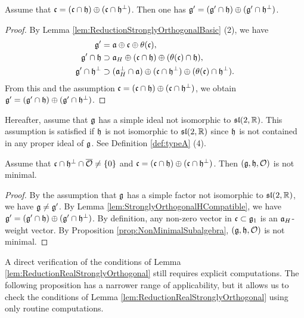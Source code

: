 \begin{lemma} \label{lem:StronglyOrthogonalHCompatible}
	Assume that $\mathfrak{c} = (\mathfrak{c} \cap \mathfrak{h}) \oplus (\mathfrak{c} \cap \mathfrak{h}^\perp)$.
	Then one has $\mathfrak{g'} = (\mathfrak{g'} \cap \mathfrak{h}) \oplus (\mathfrak{g'} \cap \mathfrak{h}^\perp)$.
\end{lemma}

\begin{proof}
	By Lemma \ref{lem:ReductionStronglyOrthogonalBasic} (2), we have
	\begin{align*}
		\mathfrak{g'} &= \mathfrak{a} \oplus \mathfrak{c} \oplus \theta(\mathfrak{c}), \\
		\mathfrak{g'} \cap \mathfrak{h} &\supset \mathfrak{a}_H \oplus (\mathfrak{c} \cap \mathfrak{h}) \oplus (\theta(\mathfrak{c}) \cap \mathfrak{h}), \\
		\mathfrak{g'} \cap \mathfrak{h}^\perp &\supset (\mathfrak{a}_H^\perp \cap \mathfrak{a}) \oplus(\mathfrak{c} \cap \mathfrak{h}^\perp) \oplus (\theta(\mathfrak{c}) \cap \mathfrak{h}^\perp).
	\end{align*}
	From this and the assumption $\mathfrak{c} = (\mathfrak{c} \cap \mathfrak{h}) \oplus (\mathfrak{c} \cap \mathfrak{h}^\perp)$, we obtain $\mathfrak{g'} = (\mathfrak{g'} \cap \mathfrak{h}) \oplus (\mathfrak{g'} \cap \mathfrak{h}^\perp)$.
\end{proof}

Hereafter, assume that $\mathfrak{g}$ has a simple ideal not isomorphic to $\mathfrak{sl}(2,\mathbb{R})$.
This assumption is satisfied if $\mathfrak{h}$ is not isomorphic to $\mathfrak{sl}(2,\mathbb{R})$ since $\mathfrak{h}$ is not contained in any proper ideal of $\mathfrak{g}$.
See Definition \ref{def:typeA} (4).

\begin{lemma} \label{lem:ReductionRealStronglyOrthogonal}
	Assume that $\mathfrak{c} \cap \mathfrak{h}^\perp \cap \overline{\mathcal{O}} \neq \left\{0 \right\}$ and $\mathfrak{c} = (\mathfrak{c} \cap \mathfrak{h}) \oplus (\mathfrak{c} \cap \mathfrak{h}^\perp)$.
	Then $(\mathfrak{g}, \mathfrak{h}, \mathcal{O})$ is not minimal.
\end{lemma}

\begin{proof}
	By the assumption that $\mathfrak{g}$ has a simple factor not isomorphic to $\mathfrak{sl}(2,\mathbb{R})$, we have $\mathfrak{g} \neq \mathfrak{g'}$.
	By Lemma \ref{lem:StronglyOrthogonalHCompatible}, we have $\mathfrak{g'} = (\mathfrak{g'} \cap \mathfrak{h}) \oplus (\mathfrak{g'} \cap \mathfrak{h}^\perp)$.
	By definition, any non-zero vector in $\mathfrak{c} \subset \mathfrak{g}_1$ is an $\mathfrak{a}_H$-weight vector.
	By Proposition \ref{prop:NonMinimalSubalgebra}, $(\mathfrak{g}, \mathfrak{h}, \mathcal{O})$ is not minimal.
\end{proof}

A direct verification of the conditions of Lemma \ref{lem:ReductionRealStronglyOrthogonal} still requires explicit computations.
The following proposition has a narrower range of applicability, but it allows us to check the conditions of Lemma \ref{lem:ReductionRealStronglyOrthogonal} using only routine computations.

